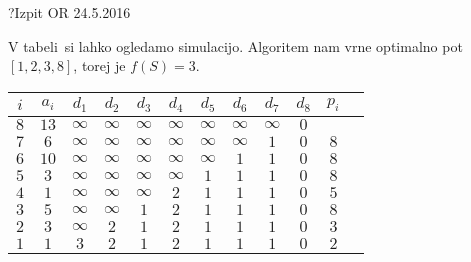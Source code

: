 \begin{naloga}{?}{Izpit OR 24.5.2016}
\begin{odgovor}
\begin{enumerate}[(a)]
V tabeli~\tab si lahko ogledamo simulacijo.
Algoritem nam vrne optimalno pot $[1, 2, 3, 8]$, torej je $f(S) = 3$.

\begin{tabela}
\begin{tabular}{cc|cccccccccc}
$i$ & $a_i$ & $d_1$ & $d_2$ & $d_3$ & $d_4$ & $d_5$ & $d_6$ & $d_7$ & $d_8$ & $p_i$\\ \hline
$8$ & $13$ & $\infty$ & $\infty$ & $\infty$ & $\infty$ & $\infty$ & $\infty$ & $\infty$ & $0$ & \\
$7$ & $6$ & $\infty$ & $\infty$ & $\infty$ & $\infty$ & $\infty$ & $\infty$ & $1$ & $0$ & $8$\\
$6$ & $10$ & $\infty$ & $\infty$ & $\infty$ & $\infty$ & $\infty$ & $1$ & $1$ & $0$ & $8$\\
$5$ & $3$ & $\infty$ & $\infty$ & $\infty$ & $\infty$ & $1$ & $1$ & $1$ & $0$ & $8$\\
$4$ & $1$ & $\infty$ & $\infty$ & $\infty$ & $2$ & $1$ & $1$ & $1$ & $0$ & $5$\\
$3$ & $5$ & $\infty$ & $\infty$ & $1$ & $2$ & $1$ & $1$ & $1$ & $0$ & $8$\\
$2$ & $3$ & $\infty$ & $2$ & $1$ & $2$ & $1$ & $1$ & $1$ & $0$ & $3$\\
$1$ & $1$ & $3$ & $2$ & $1$ & $2$ & $1$ & $1$ & $1$ & $0$ & $2$
\end{tabular}
\end{tabela}


\end{enumerate}

\end{odgovor}
\end{naloga}
